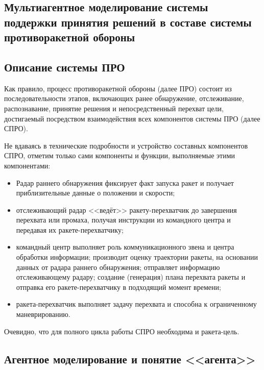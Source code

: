 \parindent=1cm %

\begin{center}
		
		\section{Мультиагентное моделирование системы поддержки принятия решений в составе системы противоракетной обороны}
		
\end{center}

\subsection{Описание системы ПРО} 

Как правило, процесс противоракетной обороны (далее ПРО) состоит из последовательности этапов, включающих ранее обнаружение, отслеживание, распознавание, принятие решения и непосредственный перехват цели, достигаемый посредством взаимодействия всех компонентов системы ПРО (далее СПРО). 

Не вдаваясь в технические подробности и устройство составных компонентов СПРО, отметим только сами компоненты и функции, выполняемые этими компонентами:

\begin{itemize}
	\item Радар раннего обнаружения фиксирует факт запуска ракет и получает приблизительные данные о положении и скорости;
	\item отслеживающий радар <<ведёт>> ракету-перехватчик до завершения перехвата или промаха, получая инструкции из командного центра и передавая их ракете-перехватчику;
	\item командный центр выполняет роль коммуникационного звена и центра обработки информации; производит оценку траектории ракеты, на основании  данных от радара раннего обнаружения; отправляет информацию отслеживающему радару;  создание (генерация) плана перехвата ракеты и отправка его ракете-перехватчику в подходящий момент времени;
	\item ракета-перехватчик выполняет задачу перехвата и способна к ограниченному маневрированию.
\end{itemize} 

Очевидно, что для полного цикла работы СПРО необходима и ракета-цель. 




\subsection{Агентное моделирование и понятие <<агента>>}

\newpage %